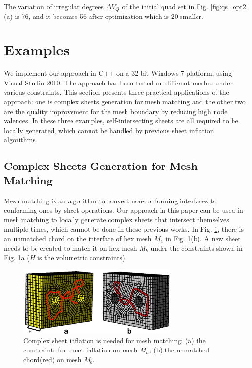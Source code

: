 \documentclass[final,5p,times,twocolumn]{elsarticle}
\begin{document}
The variation of irregular degrees $\Delta V_Q$ of the initial quad set in Fig. \ref{fig:qs_opt2}(a) is 76, and it becomes 56 after optimization which is 20 smaller.

\section{Examples}
\label{sec:examples}
We implement our approach in C++ on a 32-bit Windows 7 platform, using Visual Studio 2010. The approach has been tested on different meshes under various constraints. This section presents three practical applications of the approach: one is complex sheets generation for mesh matching and the other two are the quality improvement for the mesh boundary by reducing high node valences. In these three examples, self-intersecting sheets are all required to be locally generated, which cannot be handled by previous sheet inflation algorithms.

\subsection{Complex Sheets Generation for Mesh Matching}
\label{sec:mesh_matching}
Mesh matching is an algorithm to convert non-conforming interfaces to conforming ones by sheet operations\cite{Staten2010d, Chen:2015kf}. Our approach in this paper can be used in mesh matching to locally generate complex sheets that intersect themselves multiple times, which cannot be done in these previous works. In Fig. \ref{fig:exam1_input}, there is an unmatched chord on the interface of hex mesh $M_a$ in Fig. \ref{fig:exam1_input}(b). A new sheet needs to be created to match it on hex mesh $M_b$ under the constraints shown in Fig. \ref{fig:exam1_input}a ($H$ is the volumetric constraints).

\begin{figure}[htbp]
\begin{center}
\includegraphics[width=8cm]{figures/exam1_input.png}
\caption{Complex sheet inflation is needed for mesh matching: (a) the constraints for sheet inflation on mesh $M_a$; (b) the unmatched chord(red) on mesh $M_b$.}
\label{fig:exam1_input}
\end{center}
\end{figure}
\end{document}
